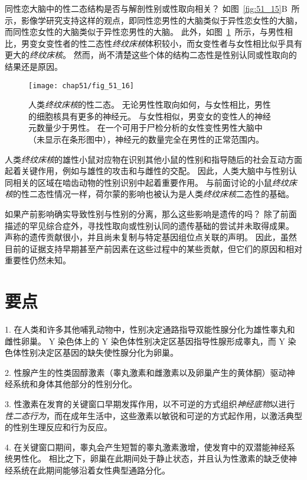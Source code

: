 同性恋大脑中的性二态结构是否与解剖性别或性取向相关？
如图~\ref{fig:51_15}B~所示，影像学研究支持这样的观点，即同性恋男性的大脑类似于异性恋女性的大脑，而同性恋女性的大脑类似于异性恋男性的大脑。
此外，如图~\ref{fig:51_16}~所示，与男性相比，男变女变性者的性二态性\textit{终纹床核}体积较小，而女变性者与女性相比似乎具有更大的\textit{终纹床核}。
然而，尚不清楚这些个体的结构二态性是性别认同或性取向的结果还是原因。


\begin{figure}[htbp]
	\centering
	\texttt{[image: chap51/fig\_51\_16]}
	\caption{人类\textit{终纹床核}的性二态。
		无论男性性取向如何，与女性相比，男性的细胞核具有更多的神经元。
		与女性相似，男变女的变性人的神经元数量少于男性。
		在一个可用于尸检分析的女性变性男性大脑中（未显示在条形图中），神经元的数量完全在男性的正常范围内\cite{kruijver2000male}。}
	\label{fig:51_16}
\end{figure}


人类\textit{终纹床核}的雄性小鼠对应物在识别其他小鼠的性别和指导随后的社会互动方面起着关键作用，例如与雄性的攻击和与雌性的交配。
因此，人类大脑中与性别认同相关的区域在啮齿动物的性别识别中起着重要作用。
与前面讨论的小鼠\textit{终纹床核}的性二态性情况一样，荷尔蒙的影响也被认为是人类\textit{终纹床核}二态性的基础。


如果产前影响确实导致性别与性别的分离，那么这些影响是遗传的吗？
除了前面描述的罕见综合症外，寻找性取向或性别认同的遗传基础的尝试并未取得成果。
声称的遗传贡献很小，并且尚未复制与特定基因组位点关联的声明。
因此，虽然目前的证据支持早期甚至产前因素在这些过程中的某些贡献，但它们的原因和相对重要性仍然未知。


\section{要点}

1. 在人类和许多其他哺乳动物中，性别决定通路指导双能性腺分化为雄性睾丸和雌性卵巢。
Y 染色体上的 Y 染色体性别决定区基因指导性腺形成睾丸，而 Y 染色体性别决定区基因的缺失使性腺分化为卵巢。


2. 性腺产生的性类固醇激素（睾丸激素和雌激素以及卵巢产生的黄体酮）驱动神经系统和身体其他部分的性别分化。


3. 性激素在发育的关键窗口早期发挥作用，以不可逆的方式组织\textit{神经底物}以进行\textit{性二态行为}，而在成年生活中，这些激素以敏锐和可逆的方式起作用，以激活典型的性别生理反应和行为反应。


4. 在关键窗口期间，睾丸会产生短暂的睾丸激素激增，使发育中的双潜能神经系统男性化。
相比之下，卵巢在此期间处于静止状态，并且认为性激素的缺乏使神经系统在此期间能够沿着女性典型通路分化。


